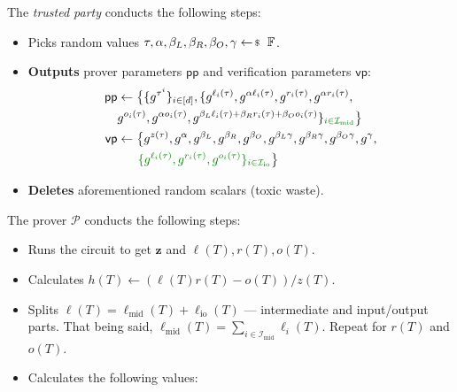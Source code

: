 \documentclass[../../book.tex]{subfiles}
\begin{document}
\begin{tcolorbox}
    The \emph{trusted party} conducts the following steps:
    \begin{itemize}[label=]
        \item Picks random values $\tau, \alpha, \beta_L, \beta_R, \beta_O, \gamma \leftarrowS \mathbb{F}$.
        \item \textbf{Outputs} prover parameters $\mathsf{pp}$ and verification parameters $\mathsf{vp}$:
        \begin{equation*}        
            \begin{aligned}
                \mathsf{pp} & \gets \big\{\{g^{\tau^i}\}_{i \in [d]}, \{g^{\ell_i(\tau)}, g^{\alpha \ell_i(\tau)}, g^{r_i(\tau)}, g^{\alpha r_i(\tau)}, \\ 
                            & g^{o_i(\tau)}, g^{\alpha o_i(\tau)}, g^{\beta_L\ell_i(\tau)+\beta_Rr_i(\tau)+\beta_Oo_i(\tau)}\}_{\textcolor{green!50!black}{i \in \mathcal{I}_{\text{mid}}}}\big\} \\
                \mathsf{vp} & \gets \big\{ g^{z(\tau)}, g^{\alpha}, g^{\beta_L}, g^{\beta_R}, g^{\beta_O}, g^{\beta_L\gamma}, g^{\beta_R\gamma}, g^{\beta_O\gamma}, g^{\gamma}, \\
                            & \;\;\;\;\;\; \textcolor{green!50!black}{ \{g^{\ell_i(\tau)}, g^{r_i(\tau)}, g^{o_i(\tau)}\}_{i \in \mathcal{I}_{\text{io}}} } \big\}
            \end{aligned}
        \end{equation*}
    \item \textbf{Deletes} aforementioned random scalars (toxic waste).
    \end{itemize}
    The prover $\mathcal{P}$ conducts the following steps:
    \begin{itemize}[label=]
        \item Runs the circuit to get $\mathbf{z}$ and $\ell(T),r(T),o(T)$.
        \item Calculates $h(T) \gets (\ell(T)r(T) - o(T))\big/ z(T)$.
        \item \textcolor{green!50!black}{Splits $\ell(T) = \ell_{\text{mid}}(T) + \ell_{\text{io}}(T)$ --- intermediate and input/output parts. That being said, $\ell_{\text{mid}}(T) = \sum_{i \in \mathcal{I}_{\text{mid}}}\ell_i(T)$. Repeat for $r(T)$ and $o(T)$.}
        \item Calculates the following values: 
        \begin{align*}

\end{align*}
\end{itemize}
\end{tcolorbox}
\end{document}
